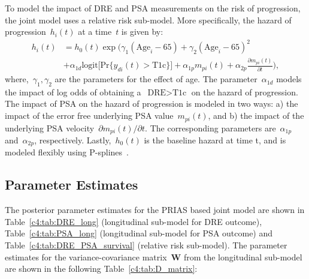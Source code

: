 \begin{subappendices}
To model the impact of DRE and PSA measurements on the risk of progression, the joint model uses a relative risk sub-model. More specifically, the hazard of progression~$h_i(t)$ at a time~$t$ is given by:
\begin{equation}
\label{c4:eq:rel_risk_model}
\begin{split}
    h_i(t) &= h_0(t) \exp\Big(\gamma_1 (\mbox{Age}_i-65) + \gamma_2 (\mbox{Age}_i-65)^2\\
    &+\alpha_{1d} \mbox{logit} \big[\mbox{Pr}\{y_{di}(t) > \mbox{T1c}\}\big]+ \alpha_{1p} m_{pi}(t) + \alpha_{2p} \frac{\partial m_{pi}(t)}{\partial {t}}\Big),
    \end{split}
\end{equation}
where,~$\gamma_1, \gamma_2$ are the parameters for the effect of age. The parameter~$\alpha_{1d}$ models the impact of log odds of obtaining a~$\mbox{DRE} > \mbox{T1c}$ on the hazard of progression. The impact of PSA on the hazard of progression is modeled in two ways: a) the impact of the error free underlying PSA value~$m_{pi}(t)$, and b) the impact of the underlying PSA velocity~$\partial m_{pi}(t)/\partial {t}$. The corresponding parameters are~$\alpha_{1p}$ and~$\alpha_{2p}$, respectively. Lastly,~$h_0(t)$ is the baseline hazard at time t, and is modeled flexibly using P-splines~\citep{eilers1996flexible}.

\subsection{Parameter Estimates}
\label{c4:appendix:param_estimates}
The posterior parameter estimates for the PRIAS based joint model are shown in Table~\ref{c4:tab:DRE_long} (longitudinal sub-model for DRE outcome), Table~\ref{c4:tab:PSA_long} (longitudinal sub-model for PSA outcome) and Table~\ref{c4:tab:DRE_PSA_survival} (relative risk sub-model). The parameter estimates for the variance-covariance matrix~$\boldsymbol{W}$ from the longitudinal sub-model are shown in the following Table~\ref{c4:tab:D_matrix}:


\end{subappendices}

